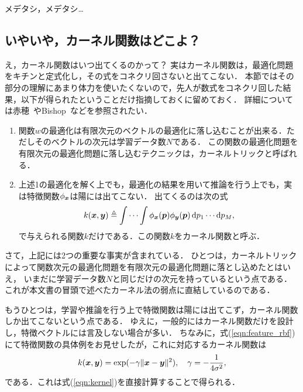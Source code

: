 \begin{center}
メデタシ，メデタシ\ldots
\end{center}

\subsection{いやいや，カーネル関数はどこよ？}

え，カーネル関数はいつ出てくるのかって？
実はカーネル関数は，最適化問題をキチンと定式化し，その式をコネクリ回さないと出てこない．
本節ではその部分の理解にあまり体力を使いたくないので，先人が数式をコネクリ回した結果，以下が得られたということだけ指摘しておくに留めておく．
詳細については赤穂~\cite{Akaho2008}やBishop~\cite{Bishop2010}などを参照されたい．
\begin{enumerate}
    \item 関数$w$の最適化は有限次元のベクトルの最適化に落し込むことが出来る．ただしそのベクトルの次元は学習データ数$N$である．
          この関数の最適化問題を有限次元の最適化問題に落し込むテクニックは，カーネルトリックと呼ばれる．
    \item 上述1の最適化を解く上でも，最適化の結果を用いて推論を行う上でも，実は特徴関数$\phi_{\boldsymbol{x}}$は陽には出てこない．
          出てくるのは次の式
          \begin{equation}
              k(\boldsymbol{x}, \boldsymbol{y}) \triangleq \idotsint \phi_{\boldsymbol{x}}(\boldsymbol{p}) 
              \phi_{\boldsymbol{y}}(\boldsymbol{p}) \, \mathrm{d}p_1 \cdots \mathrm{d}p_M,
              \label{eqn:kernel}
          \end{equation}
          で与えられる関数$k$だけである．この関数$k$をカーネル関数と呼ぶ．
\end{enumerate}

さて，上記には2つの重要な事実が含まれている．
ひとつは，カーネルトリックによって関数次元の最適化問題を有限次元の最適化問題に落とし込めたとはいえ，
いまだに学習データ数$N$と同じだけの次元を持っているという点である．
これが本文書の冒頭で述べたカーネル法の弱点に直結しているのである．

もうひとつは，学習や推論を行う上で特徴関数は陽には出てこず，カーネル関数しか出てこないという点である．
ゆえに，一般的にはカーネル関数だけを設計し，特徴ベクトルには言及しない場合が多い．
ちなみに，式(\ref{eqn:feature_rbf})にて特徴関数の具体例をお見せしたが，これに対応するカーネル関数は
\begin{equation}
    k(\boldsymbol{x}, \boldsymbol{y}) = \exp(- \gamma \|\boldsymbol{x} - \boldsymbol{y}\|^2),
    \hspace{10pt} \gamma = - \frac{1}{4 \sigma^2},
    \label{eqn:kernel_rbf}
\end{equation}
である．これは式(\ref{eqn:kernel})を直接計算することで得られる．

